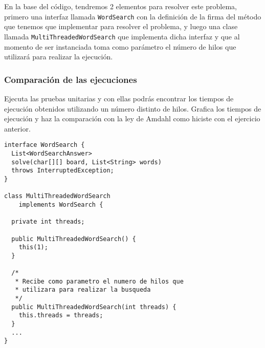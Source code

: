 \documentclass[a4paper,11pt]{article}
\begin{document}
	En la base del código, tendremos 2 elementos para resolver este problema, primero una interfaz llamada \verb|WordSearch| con la definición de la firma del método que tenemos que implementar para resolver el problema, y luego una clase llamada \verb|MultiThreadedWordSearch| que implementa dicha interfaz y que al momento de ser instanciada toma como parámetro el número de hilos que utilizará para realizar la ejecución.

	\subsubsection*{Comparación de las ejecuciones}
	Ejecuta las pruebas unitarias y con ellas podrás encontrar los tiempos de ejecución obtenidos utilizando un número distinto de hilos. Grafica los tiempos de ejecución y haz la comparación con la ley de Amdahl como hiciste con el ejercicio anterior.

	\begin{tcolorbox}
		\begin{lstlisting}
interface WordSearch {
  List<WordSearchAnswer> 
  solve(char[][] board, List<String> words) 
  throws InterruptedException;
}

class MultiThreadedWordSearch 
    implements WordSearch {

  private int threads;

  public MultiThreadedWordSearch() {
    this(1);
  }

  /* 
   * Recibe como parametro el numero de hilos que
   * utilizara para realizar la busqueda
   */
  public MultiThreadedWordSearch(int threads) {
    this.threads = threads;
  }
  ...
}
		\end{lstlisting}
	\end{tcolorbox}
\end{document}
